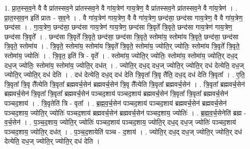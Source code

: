 \documentclass[17pt]{extarticle}
\begin{document}
1. प्रा॒त॒स्स॒व॒ने वै वै प्रा॑तस्सव॒ने प्रा॑तस्सव॒ने वै गा॑य॒त्रेण॑ गाय॒त्रेण॒ वै प्रा॑तस्सव॒ने प्रा॑तस्सव॒ने वै गा॑य॒त्रेण॑ । . प्रा॒त॒स्स॒व॒न इति॑ प्रातः - स॒व॒ने । . वै गा॑य॒त्रेण॑ गाय॒त्रेण॒ वै वै गा॑य॒त्रेण॒ छन्द॑सा॒ छन्द॑सा गाय॒त्रेण॒ वै वै गा॑य॒त्रेण॒ छन्द॑सा । . गा॒य॒त्रेण॒ छन्द॑सा॒ छन्द॑सा गाय॒त्रेण॑ गाय॒त्रेण॒ छन्द॑सा त्रि॒वृते᳚ त्रि॒वृते॒ छन्द॑सा गाय॒त्रेण॑ गाय॒त्रेण॒ छन्द॑सा त्रि॒वृते᳚ । . छन्द॑सा त्रि॒वृते᳚ त्रि॒वृते॒ छन्द॑सा॒ छन्द॑सा त्रि॒वृते॒ स्तोमा॑य॒ स्तोमा॑य त्रि॒वृते॒ छन्द॑सा॒ छन्द॑सा त्रि॒वृते॒ स्तोमा॑य । . त्रि॒वृते॒ स्तोमा॑य॒ स्तोमा॑य त्रि॒वृते᳚ त्रि॒वृते॒ स्तोमा॑य॒ ज्योति॒र् ज्योतिः॒ स्तोमा॑य त्रि॒वृते᳚ त्रि॒वृते॒ स्तोमा॑य॒ ज्योतिः॑ । . त्रि॒वृत॒ इति॑ त्रि - वृते᳚ । . स्तोमा॑य॒ ज्योति॒र् ज्योतिः॒ स्तोमा॑य॒ स्तोमा॑य॒ ज्योति॒र् दध॒द् दध॒ज् ज्योतिः॒ स्तोमा॑य॒ स्तोमा॑य॒ ज्योति॒र् दध॑त् । . ज्योति॒र् दध॒द् दध॒ज् ज्योति॒र् ज्योति॒र् दध॑ देत्येति॒ दध॒ज् ज्योति॒र् ज्योति॒र् दध॑ देति । . दध॑ देत्येति॒ दध॒द् दध॑ देति त्रि॒वृता᳚ त्रि॒वृ तै॑ति॒ दध॒द् दध॑ देति त्रि॒वृता᳚ । . ए॒ति॒ त्रि॒वृता᳚ त्रि॒वृ तै᳚त्येति त्रि॒वृता᳚ ब्रह्मवर्च॒सेन॑ ब्रह्मवर्च॒सेन॑ त्रि॒वृ तै᳚त्येति त्रि॒वृता᳚ ब्रह्मवर्च॒सेन॑ । . त्रि॒वृता᳚ ब्रह्मवर्च॒सेन॑ ब्रह्मवर्च॒सेन॑ त्रि॒वृता᳚ त्रि॒वृता᳚ ब्रह्मवर्च॒सेन॑ पञ्चद॒शाय॑ पञ्चद॒शाय॑ ब्रह्मवर्च॒सेन॑ त्रि॒वृता᳚ त्रि॒वृता᳚ ब्रह्मवर्च॒सेन॑ पञ्चद॒शाय॑ । . त्रि॒वृतेति॑ त्रि - वृता᳚ । . ब्र॒ह्म॒व॒र्च॒सेन॑ पञ्चद॒शाय॑ पञ्चद॒शाय॑ ब्रह्मवर्च॒सेन॑ ब्रह्मवर्च॒सेन॑ पञ्चद॒शाय॒ ज्योति॒र् ज्योतिः॑ पञ्चद॒शाय॑ ब्रह्मवर्च॒सेन॑ ब्रह्मवर्च॒सेन॑ पञ्चद॒शाय॒ ज्योतिः॑ । . ब्र॒ह्म॒व॒र्च॒सेनेति॑ ब्रह्म - व॒र्च॒सेन॑ । . प॒ञ्च॒द॒शाय॒ ज्योति॒र् ज्योतिः॑ पञ्चद॒शाय॑ पञ्चद॒शाय॒ ज्योति॒र् दध॒द् दध॒ज् ज्योतिः॑ पञ्चद॒शाय॑ पञ्चद॒शाय॒ ज्योति॒र् दध॑त् । . प॒ञ्च॒द॒शायेति॑ पञ्च - द॒शाय॑ । . ज्योति॒र् दध॒द् दध॒ज् ज्योति॒र् ज्योति॒र् दध॑ देत्येति॒ दध॒ज् ज्योति॒र् ज्योति॒र् दध॑ देति । \newline
\end{document}
